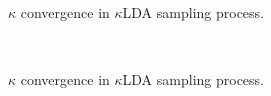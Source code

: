 \begin{figure}
\begin{center}
{}
\end{center}                    
\caption[$\kappa$ convergence in $\kappa$LDA sampling process.]{$\kappa$ convergence in $\kappa$LDA sampling process.\label{figC:kldaKappaIt}}
\end{figure}

\begin{figure}
\begin{center}
\hfill
{}\\
\end{center}                    
\caption[$\kappa$ convergence in $\kappa$LDA sampling process.]{$\kappa$ convergence in $\kappa$LDA sampling process.\label{figC:kldaKappaIt2}}
\end{figure}